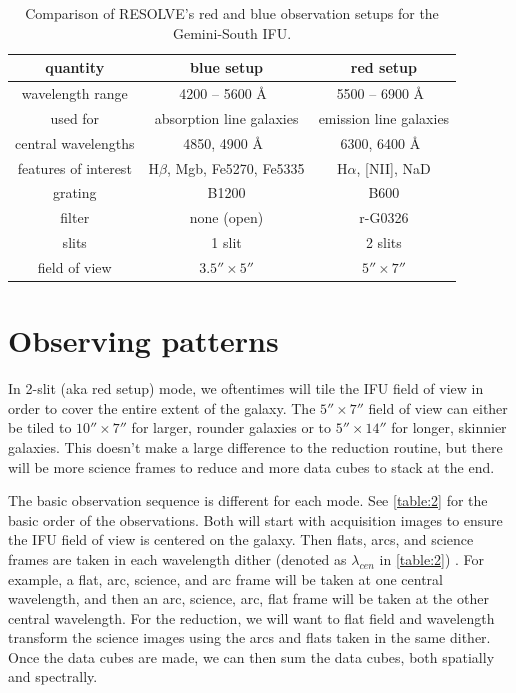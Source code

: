 \documentclass[12pt]{report}
\begin{document}
\begin{table}
\centering
\begin{tabular}[t]{|c|c|c|}
  \hline
quantity  & blue setup & red setup \\ \hline
wavelength range & 4200 -- 5600 \AA\ &  5500 -- 6900 \AA\ \\ 
used for & absorption line galaxies & emission line galaxies \\
central wavelengths & 4850, 4900 \AA\ & 6300, 6400 \AA\ \\
features of interest & H$\beta$, Mgb, Fe5270, Fe5335 & H$\alpha$, [NII], NaD \\ 
grating & B1200 & B600 \\ 
filter & none (open) & r-G0326 \\
slits & 1 slit & 2 slits \\ 
field of view & $3.5''\times5''$ & $5''\times7''$ \\ \hline
\end{tabular}
\caption[RESOLVE's Observation Setups]{Comparison of RESOLVE's red and blue observation setups for the Gemini-South IFU.}
\label{table:1}
\end{table}

\section{Observing patterns}
\label{patterns}
In 2-slit (aka red setup) mode, we oftentimes will tile the IFU field of view in order to cover the entire extent of the galaxy. The $5''\times7''$ field of view can either be tiled to $10''\times7''$ for larger, rounder galaxies or to  $5''\times14''$ for longer, skinnier galaxies. This doesn't make a large difference to the reduction routine, but there will be more science frames to reduce and more data cubes to stack at the end.

The basic observation sequence is different for each mode. See \autoref{table:2} for the basic order of the observations. Both will start with acquisition images to ensure the IFU field of view is centered on the galaxy. Then flats, arcs, and science frames are taken in each wavelength dither (denoted as $\lambda_{cen}$ in \autoref{table:2}) . For example, a flat, arc, science, and arc frame will be taken at one central wavelength, and then an arc, science, arc, flat frame will be taken at the other central wavelength. For the reduction, we will want to flat field and wavelength transform the science images using the arcs and flats taken in the same dither. Once the data cubes are made, we can then sum the data cubes, both spatially and spectrally.
\end{document}
